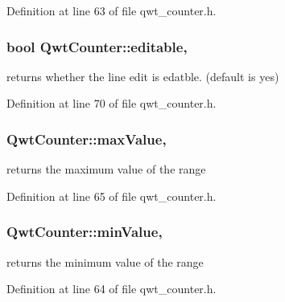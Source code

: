 Definition at line 63 of file qwt\-\_\-counter.\-h.

\hypertarget{class_qwt_counter_a3fb541ce259dceef47e927cc697f739c}{
\subsubsection[{editable}]{\setlength{\rightskip}{0pt plus 5cm}bool Qwt\-Counter\-::editable\hspace{0.3cm}{\ttfamily [read]}, {\ttfamily [write]}}}\label{class_qwt_counter_a3fb541ce259dceef47e927cc697f739c}


returns whether the line edit is edatble. (default is yes) 



Definition at line 70 of file qwt\-\_\-counter.\-h.

\hypertarget{class_qwt_counter_a5011e951134590d174a824385e5fb2ae}{
\subsubsection[{max\-Value}]{ Qwt\-Counter\-::max\-Value\hspace{0.3cm}{\ttfamily [read]}, {\ttfamily [write]}}}\label{class_qwt_counter_a5011e951134590d174a824385e5fb2ae}


returns the maximum value of the range 



Definition at line 65 of file qwt\-\_\-counter.\-h.

\hypertarget{class_qwt_counter_a7db2ffbdab4216c83f95fb41c89e8c53}{
\subsubsection[{min\-Value}]{ Qwt\-Counter\-::min\-Value\hspace{0.3cm}{\ttfamily [read]}, {\ttfamily [write]}}}\label{class_qwt_counter_a7db2ffbdab4216c83f95fb41c89e8c53}


returns the minimum value of the range 



Definition at line 64 of file qwt\-\_\-counter.\-h.

